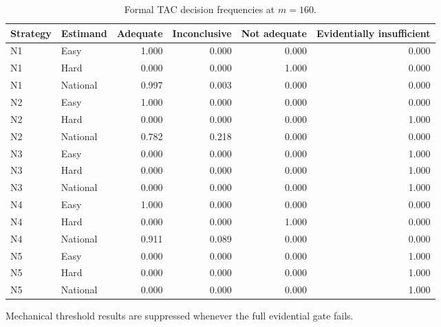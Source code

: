 \begin{table}[h!]
\centering
\small
\caption{Formal TAC decision frequencies at $m=160$.}
\label{tab:nav-tac}
\begin{tabular}{llrrrr}
\toprule
Strategy & Estimand & Adequate & Inconclusive & Not adequate & Evidentially insufficient \\
\midrule
N1 & Easy & 1.000 & 0.000 & 0.000 & 0.000 \\
N1 & Hard & 0.000 & 0.000 & 1.000 & 0.000 \\
N1 & National & 0.997 & 0.003 & 0.000 & 0.000 \\
N2 & Easy & 1.000 & 0.000 & 0.000 & 0.000 \\
N2 & Hard & 0.000 & 0.000 & 0.000 & 1.000 \\
N2 & National & 0.782 & 0.218 & 0.000 & 0.000 \\
N3 & Easy & 0.000 & 0.000 & 0.000 & 1.000 \\
N3 & Hard & 0.000 & 0.000 & 0.000 & 1.000 \\
N3 & National & 0.000 & 0.000 & 0.000 & 1.000 \\
N4 & Easy & 1.000 & 0.000 & 0.000 & 0.000 \\
N4 & Hard & 0.000 & 0.000 & 1.000 & 0.000 \\
N4 & National & 0.911 & 0.089 & 0.000 & 0.000 \\
N5 & Easy & 0.000 & 0.000 & 0.000 & 1.000 \\
N5 & Hard & 0.000 & 0.000 & 0.000 & 1.000 \\
N5 & National & 0.000 & 0.000 & 0.000 & 1.000 \\
\bottomrule
\end{tabular}
\par\vspace{2pt}
\begin{minipage}{0.97\linewidth}\footnotesize Mechanical threshold results are suppressed whenever the full evidential gate fails.\end{minipage}
\end{table}

